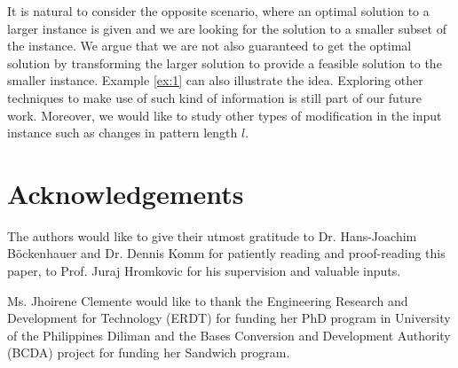 \documentclass[journal]{acm_proc_article-sp}
\begin{document}
It is natural to consider the opposite scenario, where an optimal solution to a larger instance is given and we are looking for the solution to a smaller subset of the instance. We argue that we are not also guaranteed  to get the optimal solution by transforming the larger solution to provide a feasible solution to the smaller instance. Example \ref{ex:1} can also illustrate the idea. Exploring other techniques to make use of such kind of information is still part of our future work. Moreover, we would like to study other types of modification in the input instance such as changes in pattern length $l$. 

\section{Acknowledgements}
The authors would like to give their utmost gratitude to Dr. Hans-Joachim B\"{o}ckenhauer and Dr. Dennis Komm for patiently reading and proof-reading this paper, to Prof. Juraj Hromkovic for his supervision and valuable inputs.

Ms. Jhoirene Clemente would like to thank the  Engineering Research and Development for Technology (ERDT) for funding her PhD program in University of the Philippines Diliman and the Bases Conversion and Development Authority (BCDA) project for funding her Sandwich program.



\end{document}
